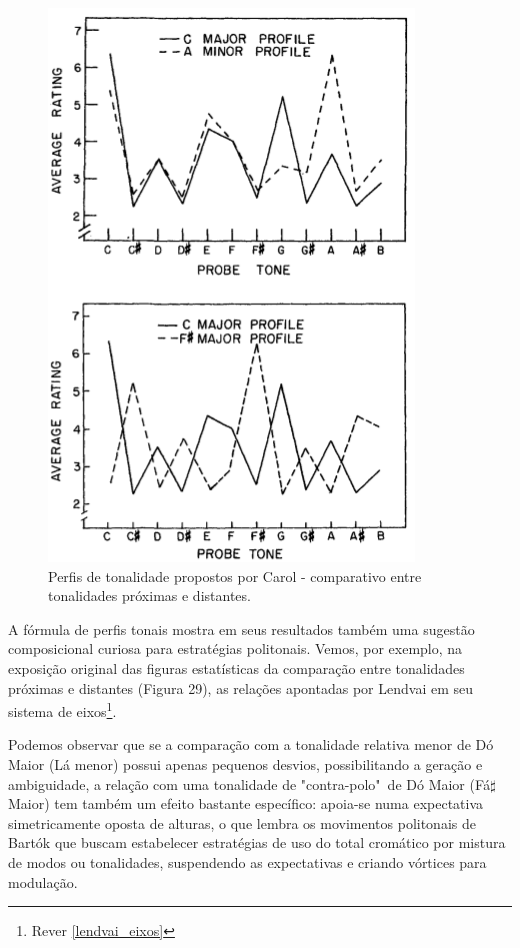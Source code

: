\documentclass[
	12pt,				%
	openright,			%
	twoside,			%
	a4paper,			%
	english,			%
	french,				%
	spanish,			%
	brazil				%
	]{abntex2}
\begin{document}
\begin{figure}[!h]
	\caption{\label{fig_grafico}Perfis de tonalidade propostos por Carol  - comparativo entre tonalidades próximas e distantes. }
	\begin{center}
	    \includegraphics[scale=0.45]{CBMS/probeones_krumhansl_p36.png}
	\end{center}
\end{figure}


A fórmula de perfis tonais mostra em seus resultados também uma sugestão composicional curiosa para estratégias politonais. Vemos, por exemplo, na exposição original das figuras estatísticas da comparação entre tonalidades próximas e distantes (Figura 29), as relações apontadas por Lendvai em seu sistema de eixos\footnote{ Rever \autoref{lendvai_eixos} }. 

Podemos observar que se a comparação com a tonalidade relativa menor de Dó Maior (Lá menor) possui apenas pequenos desvios, possibilitando a geração e ambiguidade, a relação com uma tonalidade de "contra-polo"\ de Dó Maior (Fá$\sharp$ Maior) tem também um efeito bastante específico: apoia-se numa expectativa simetricamente oposta de alturas, o que lembra os movimentos politonais de Bartók que buscam estabelecer estratégias de uso do total cromático por mistura de modos ou tonalidades, suspendendo as expectativas e criando vórtices para modulação.
\end{document}
